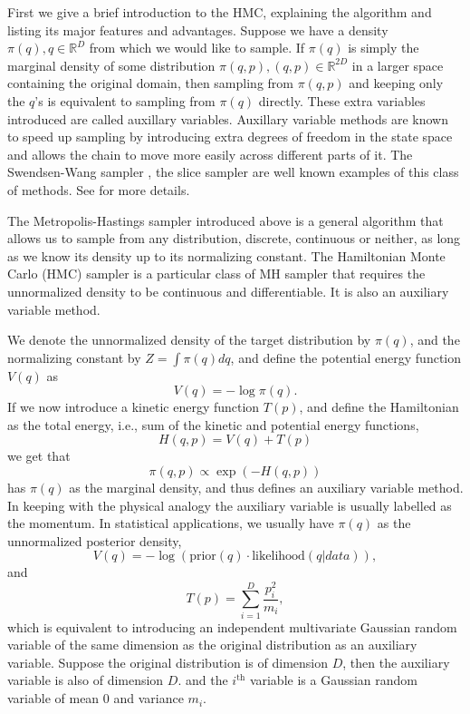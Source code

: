 \documentclass[12pt]{report}
\begin{document}
First we give a brief introduction to the HMC, explaining the algorithm and listing its major features and advantages. Suppose we have a density $\pi(q),q \in \mathbb{R}^D$ from which we would like to
sample. If $\pi(q)$ is simply the marginal density of some distribution $\pi(q,p),
(q,p) \in \mathbb{R}^{2D}$ in a larger space containing the original domain, then sampling from $\pi(q,p)$ and keeping only the $q$'s is equivalent to sampling from $\pi(q)$ directly. These extra variables introduced are called auxillary variables. Auxillary variable methods are known to speed up sampling by introducing extra degrees of freedom in the state space and allows the chain to move more easily across different parts of it. The Swendsen-Wang sampler \cite{wang1990cluster}, the slice sampler\cite{wang1990cluster} are well known examples of this class of methods. See \cite{liang2011advanced,liu2008monte} for more details.

The Metropolis-Hastings sampler introduced above is a general algorithm that allows us to sample from any distribution, discrete, continuous or neither, as long as we know its density up to its normalizing constant. The Hamiltonian Monte Carlo (HMC) sampler is a particular class of MH sampler that requires the unnormalized density to be continuous and differentiable. It is also an auxiliary variable method. 


We denote the unnormalized density of the target distribution by $\pi(q)$, and the normalizing constant by $Z = \int\pi(q)dq $, and define the potential energy function $V(q)$ as 
\[ V(q) =  -\log \pi(q) .\]
If we now introduce a kinetic energy function $T(p)$, and define
the Hamiltonian as the total energy, i.e., sum of the kinetic and potential energy functions, 
\[ H(q,p) = V(q) + T(p) \]
we get that 
\[\pi(q,p) \propto  \exp(-H(q,p)) \]
has $\pi(q)$ as the marginal density, and thus defines an auxiliary variable method. In keeping with the physical analogy the auxiliary variable is usually labelled as the momentum.  In statistical applications, we usually have $\pi(q)$ as the unnormalized posterior
density, 
\[V(q) = -\log(\text{prior}(q) \cdot \text{likelihood}(q|data) ), \]
and 
\[T(p) = \sum_{i=1}^D \frac{p_i^2}{m_i}, \]
which is equivalent to introducing an independent multivariate Gaussian random variable of
the same dimension as the original distribution as an auxiliary variable. Suppose the original distribution is of dimension $D$, then the auxiliary variable is also of dimension $D$. and the $i^{\text{th}}$ variable is a Gaussian random variable of mean 0 and variance $m_i$.
\end{document}
